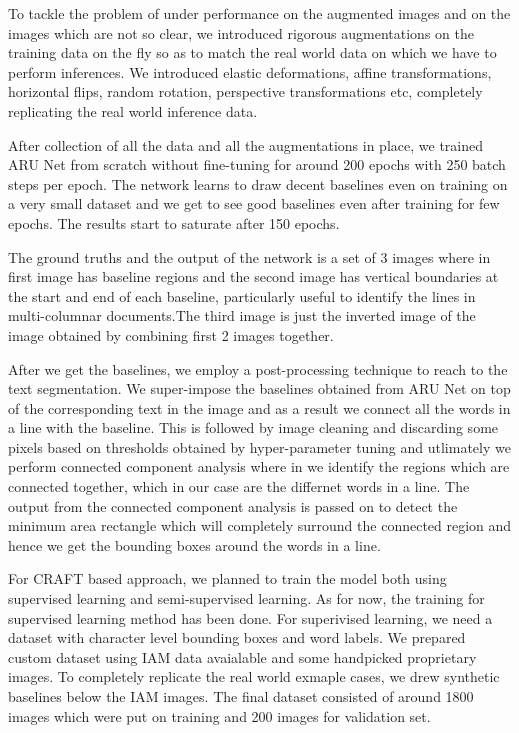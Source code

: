 To tackle the problem of under performance on the augmented images and on the images which are not so clear, we introduced rigorous augmentations on the training data on the fly so as to match the real world data on which we have to perform inferences. We introduced elastic deformations, affine transformations, horizontal flips, random rotation, perspective transformations etc, completely replicating the real world inference data.

After collection of all the data and all the augmentations in place, we trained ARU Net from scratch without fine-tuning for around 200 epochs with 250 batch steps per epoch. The network learns to draw decent baselines even on training on a very small dataset and we get to see good baselines even after training for few epochs. The results start to saturate after 150 epochs.

The ground truths and the output of the network is a set of 3 images where in first image has baseline regions and the second image has vertical boundaries at the start and end of each baseline, particularly useful to identify the lines in multi-columnar documents.The third image is just the inverted image of the image obtained by combining first 2 images together.

After we get the baselines, we employ a post-processing technique to reach to the text segmentation. We super-impose the baselines obtained from ARU Net on top of the corresponding text in the image and as a result we connect all the words in a line with the baseline. This is followed by image cleaning and discarding some pixels based on thresholds obtained by hyper-parameter tuning and utlimately we perform connected component analysis where in we identify the regions which are connected together, which in our case are the differnet words in a line. The output from the connected component analysis is passed on to detect the minimum area rectangle which will completely surround the connected region and hence we get the bounding boxes around the words in a line.

For CRAFT based approach, we planned to train the model both using supervised learning and semi-supervised learning. As for now, the training for supervised learning method has been done. For superivised learning, we need a dataset with character level bounding boxes and word labels. We prepared custom dataset using IAM data avaialable and some handpicked proprietary images. To completely replicate the real world exmaple cases, we drew synthetic baselines below the IAM images. The final dataset consisted of around 1800 images which were put on training and 200 images for validation set.

